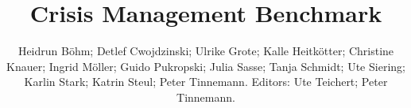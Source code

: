 \documentclass[11pt]{book}
\title{Crisis Management Benchmark}
\author{Heidrun Böhm; Detlef Cwojdzinski; Ulrike Grote; Kalle Heitkötter; Christine Knauer; Ingrid Möller; Guido Pukropski; Julia Sasse; Tanja Schmidt; Ute Siering; Karlin Stark; Katrin Steul; Peter Tinnemann. Editors: Ute Teichert; Peter Tinnemann.}
\begin{document}
\maketitle
\def\title#1{\chapter{#1}}
\tableofcontents

        
        
        
        
        
        
        
        
        
        
        
        
        
        
        
        
        
        
        
        
        
        
        
        
        
        
        
        
        
        
        
        
        
        
        
        
\end{document}
